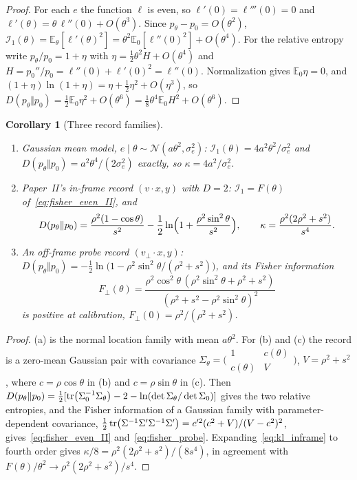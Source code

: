 \documentclass[12pt]{article}
\newtheorem{corollary}[theorem]{Corollary}
\theoremstyle{definition}
\newcommand{\E}{\mathbb E}
\begin{document}
\begin{proof}
For each $e$ the function $\ell$ is even, so $\ell'(0)=\ell'''(0)=0$ and $\ell'(\theta)=\theta\,\ell''(0)+O(\theta^3)$. Since $p_\theta-p_0=O(\theta^2)$, $\mathcal I_1(\theta)=\E_\theta[\ell'(\theta)^2]=\theta^2\E_0[\ell''(0)^2]+O(\theta^4)$. For the relative entropy write $p_\theta/p_0=1+\eta$ with $\eta=\tfrac12\theta^2H+O(\theta^4)$ and $H=p_0''/p_0=\ell''(0)+\ell'(0)^2=\ell''(0)$. Normalization gives $\E_0\eta=0$, and $(1+\eta)\ln(1+\eta)=\eta+\tfrac12\eta^2+O(\eta^3)$, so $D(p_\theta\Vert p_0)=\tfrac12\E_0\eta^2+O(\theta^6)=\tfrac18\theta^4\E_0H^2+O(\theta^6)$.
\end{proof}

\begin{corollary}[Three record families]
\label{cor:three_records}
\begin{enumerate}
\item[(a)] \emph{Gaussian mean model}, $e\mid\theta\sim\mathcal N(a\theta^2,\sigma_e^2)$: $\mathcal I_1(\theta)=4a^2\theta^2/\sigma_e^2$ and $D(p_\theta\Vert p_0)=a^2\theta^4/(2\sigma_e^2)$ exactly, so $\kappa=4a^2/\sigma_e^2$.
\item[(b)] \emph{Paper~II's in-frame record} $(v\cdot x,y)$ with $D=2$: $\mathcal I_1=F(\theta)$ of~\eqref{eq:fisher_even_II}, and
\begin{equation}
\label{eq:kl_inframe}
D(p_\theta\Vert p_0)=\frac{\rho^2(1-\cos\theta)}{s^2}-\frac12\ln\Bigl(1+\frac{\rho^2\sin^2\theta}{s^2}\Bigr),\qquad
\kappa=\frac{\rho^2(2\rho^2+s^2)}{s^4}.
\end{equation}
\item[(c)] \emph{An off-frame probe record} $(v_\perp\cdot x,y)$: $D(p_\theta\Vert p_0)=-\tfrac12\ln\bigl(1-\rho^2\sin^2\theta/(\rho^2+s^2)\bigr)$, and its Fisher information
\begin{equation}
\label{eq:fisher_probe}
F_\perp(\theta)=\frac{\rho^2\cos^2\theta\,(\rho^2\sin^2\theta+\rho^2+s^2)}{(\rho^2+s^2-\rho^2\sin^2\theta)^2}
\end{equation}
is positive at calibration, $F_\perp(0)=\rho^2/(\rho^2+s^2)$.
\end{enumerate}
\end{corollary}

\begin{proof}
(a) is the normal location family with mean $a\theta^2$. For (b) and (c) the record is a zero-mean Gaussian pair with covariance $\Sigma_\theta=\bigl(\begin{smallmatrix}1&c(\theta)\\c(\theta)&V\end{smallmatrix}\bigr)$, $V=\rho^2+s^2$, where $c=\rho\cos\theta$ in (b) and $c=\rho\sin\theta$ in (c). Then $D(p_\theta\Vert p_0)=\tfrac12[\tr(\Sigma_0^{-1}\Sigma_\theta)-2-\ln(\det\Sigma_\theta/\det\Sigma_0)]$ gives the two relative entropies, and the Fisher information of a Gaussian family with parameter-dependent covariance, $\tfrac12\tr(\Sigma^{-1}\Sigma'\Sigma^{-1}\Sigma')=c'^2(c^2+V)/(V-c^2)^2$, gives~\eqref{eq:fisher_even_II} and~\eqref{eq:fisher_probe}. Expanding~\eqref{eq:kl_inframe} to fourth order gives $\kappa/8=\rho^2(2\rho^2+s^2)/(8s^4)$, in agreement with $F(\theta)/\theta^2\to\rho^2(2\rho^2+s^2)/s^4$.
\end{proof}
\end{document}
